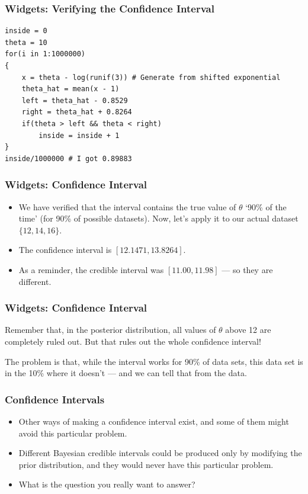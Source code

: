 \documentclass{beamer}
\begin{document}
\begin{frame}[fragile]
\frametitle{Widgets: Verifying the Confidence Interval}
\footnotesize
\begin{verbatim}
inside = 0
theta = 10
for(i in 1:1000000)
{
    x = theta - log(runif(3)) # Generate from shifted exponential
    theta_hat = mean(x - 1)
    left = theta_hat - 0.8529
    right = theta_hat + 0.8264
    if(theta > left && theta < right)
        inside = inside + 1
}
inside/1000000 # I got 0.89883
\end{verbatim}
\end{frame}


\begin{frame}
\frametitle{Widgets: Confidence Interval}
\begin{itemize}
\item We have verified that the interval contains the true value of $\theta$
`90\% of the time' (for 90\% of possible datasets). Now, let's apply it to our
actual dataset $\{12, 14, 16\}$. \pause
\item The confidence interval is $[12.1471, 13.8264]$. \pause
\item As a reminder, the credible interval was $[11.00, 11.98]$ --- so they are
different.
\end{itemize}

\end{frame}

\begin{frame}
\frametitle{Widgets: Confidence Interval}
Remember that, in the posterior distribution, all values of $\theta$
above 12 are completely ruled out. But that rules out the whole confidence
interval!

\pause

The problem is that, while the interval works for 90\% of data sets,
this data set is in the 10\% where it doesn't --- and we can tell that from the
data.
\end{frame}


\begin{frame}
\frametitle{Confidence Intervals}
\begin{itemize}
\item Other ways of making a confidence interval exist, and some of them might avoid
this particular problem.\pause
\item Different Bayesian credible intervals could be produced only by modifying the
prior distribution, and they would never have this particular problem.\pause
\item What is the question you really want to answer?
\end{itemize}

\end{frame}
\end{document}
